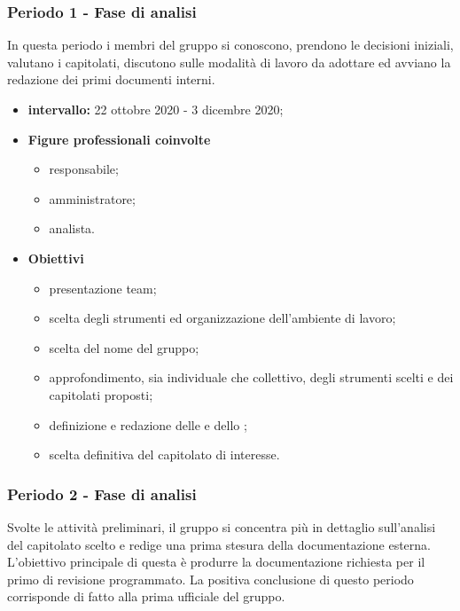 
        \subsubsection{Periodo 1 - Fase di analisi}
    In questa periodo i membri del gruppo si conoscono, prendono le decisioni iniziali, valutano i capitolati, discutono sulle modalità di lavoro da adottare ed avviano la redazione dei primi documenti interni.
        \begin{itemize}
            \item \textbf{intervallo: }22 ottobre 2020 - 3 dicembre 2020;
            \item  \textbf{Figure professionali coinvolte}
                    \begin{itemize}
                        \item responsabile;
                        \item amministratore;
                        \item analista.
                    \end{itemize}
            \item \textbf{Obiettivi}
            \begin{itemize}
                \item presentazione team;
                \item scelta degli strumenti ed organizzazione dell'ambiente di lavoro;
                \item scelta del nome del gruppo;
                \item approfondimento, sia individuale che collettivo, degli strumenti scelti e dei capitolati proposti;
                \item definizione e redazione delle \NdP{} e dello \glo{\SdF{}};
                \item scelta definitiva del capitolato di interesse.
            \end{itemize}
        \end{itemize}
        
        \subsubsection{Periodo 2 - Fase di analisi}
        Svolte le attività preliminari, il gruppo si concentra più in dettaglio sull'analisi del capitolato scelto e redige una prima stesura della documentazione esterna. 
        L'obiettivo principale di questa  è produrre la documentazione richiesta per il primo  
        di revisione programmato. La positiva conclusione di questo periodo corrisponde di fatto alla prima  ufficiale del gruppo.
        
